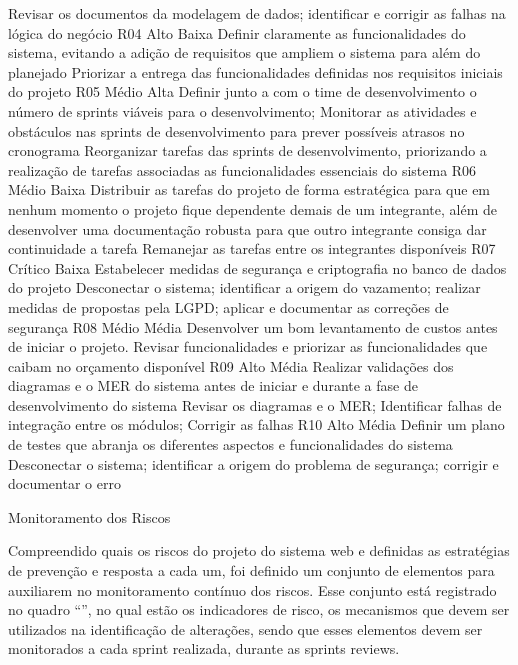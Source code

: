 	Revisar os documentos da modelagem de dados;  identificar e corrigir as falhas na lógica do negócio 
	R04
	Alto
	Baixa
	Definir claramente as funcionalidades do sistema, evitando a adição de requisitos que ampliem o sistema para além do planejado
	Priorizar a entrega das funcionalidades definidas nos requisitos iniciais do projeto
	R05
	Médio
	Alta
	Definir junto a com o time de desenvolvimento o número de sprints viáveis para o desenvolvimento; Monitorar as atividades e obstáculos nas sprints de desenvolvimento para prever possíveis atrasos no cronograma
	Reorganizar tarefas das sprints de desenvolvimento, priorizando a realização de tarefas associadas as funcionalidades essenciais do sistema
	R06
	Médio
	Baixa
	Distribuir as tarefas do projeto de forma estratégica  para que em nenhum momento o projeto fique dependente demais de um integrante, além de desenvolver uma documentação robusta para que outro integrante consiga dar continuidade a tarefa
	Remanejar as tarefas entre os integrantes disponíveis
	R07
	Crítico
	Baixa
	Estabelecer medidas de segurança e criptografia no banco de dados do projeto
	Desconectar o sistema; identificar a origem do vazamento; realizar medidas de propostas pela LGPD; aplicar e documentar as correções de segurança
	R08
	Médio
	Média
	Desenvolver um bom levantamento de custos antes de iniciar o projeto.
	Revisar funcionalidades e priorizar as funcionalidades que caibam no orçamento disponível
	R09
	Alto
	Média
	Realizar validações dos diagramas e o MER do sistema antes de iniciar e durante a fase de desenvolvimento do sistema
	Revisar os diagramas e o MER; Identificar falhas de integração entre os módulos; Corrigir as falhas
	R10
	Alto
	Média
	Definir um plano de testes que abranja os diferentes aspectos e funcionalidades do sistema
	Desconectar o sistema; identificar a origem do problema de segurança; corrigir e documentar o erro
	



        
Monitoramento dos Riscos


        Compreendido quais os riscos do projeto do sistema web e definidas as estratégias de prevenção e resposta a cada um, foi definido um conjunto de elementos para auxiliarem no monitoramento contínuo dos riscos. Esse conjunto está registrado no quadro “”, no qual estão os indicadores de risco, os mecanismos que devem ser utilizados na identificação de alterações, sendo que  esses elementos devem ser monitorados a cada sprint realizada, durante as sprints reviews.




